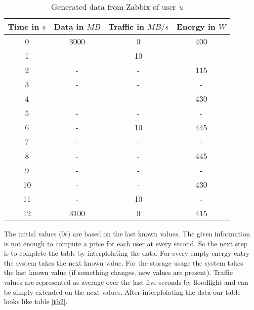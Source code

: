 \begin{table}
\centering
\caption{Generated data from Zabbix of user \textit{u}}
\begin{tabular}{|c|c|c|c|}
 \hline Time in $s$ & Data in $MB$ & Traffic in $MB/s$ & Energy in $W$ \\ 
  \hline 0 & 3000 & 0 & 400 \\ 
 \hline 1 & - & 10 & - \\ 
 \hline 2 & - & - & 115 \\ 
 \hline 3 & - & - & -\\ 
 \hline 4 & - & - & 430 \\ 
 \hline 5 & - & - & - \\
 \hline 6 & - & 10 & 445 \\ 
 \hline 7 & - & - & -\\ 
 \hline 8 & - & - & 445 \\ 
 \hline 9 & - & - & - \\  
 \hline 10 & - & - & 430 \\
  \hline 11 & - & 10 & - \\
 \hline 12 & 3100 & 0 & 415 \\  
 \hline 
 \end{tabular}
 \label{tb1} 
 \end{table}
 
 The initial values (0s) are based on the last known values. The given information is not enough to compute a price for each user at every second. So the next step is to complete the table by interplolating the data. For every empty energy entry the system takes the next known value. For the storage usage the system takes the last known value (if something changes, new values are present). Traffic values are represented as average over the last five seconds by floodlight and can be simply extended on the next values. After interplolating the data our table looks like table \ref{tb2}.
 
